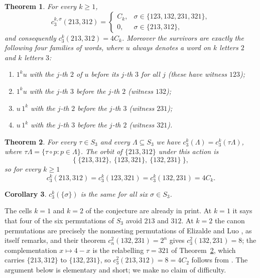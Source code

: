 \documentclass[11pt]{amsart}
\newtheorem{theorem}{Theorem}
\newtheorem{corollary}[theorem]{Corollary}
\theoremstyle{definition}
\newcommand{\Cat}{C}
\begin{document}
\begin{theorem}\label{thm:main}
For every $k\ge1$,
\[
c_3^{k,\sigma}(213,312)=
\begin{cases}
\Cat_k,&\sigma\in\{123,132,231,321\},\\
0,&\sigma\in\{213,312\},
\end{cases}
\]
and consequently $c_3^k(213,312)=4\Cat_k$.
Moreover the survivors are exactly the following four families of words, where
$u$ always denotes a word on $k$ letters $2$ and $k$ letters $3$:
\begin{enumerate}
\item[\rm(i)] $1^k u$ with the $j$-th $2$ of $u$ before its $j$-th $3$ for all
      $j$ \quad (these have witness $123$);
\item[\rm(ii)] $1^k u$ with the $j$-th $3$ before the $j$-th $2$ \quad
      (witness $132$);
\item[\rm(iii)] $u\,1^k$ with the $j$-th $2$ before the $j$-th $3$ \quad
      (witness $231$);
\item[\rm(iv)] $u\,1^k$ with the $j$-th $3$ before the $j$-th $2$ \quad
      (witness $321$).
\end{enumerate}
\end{theorem}

\begin{theorem}\label{thm:orbit}
For every $\tau\in S_3$ and every $\Lambda\subseteq S_3$ we have
$c_3^k(\Lambda)=c_3^k(\tau\Lambda)$, where
$\tau\Lambda=\{\tau\circ p:p\in\Lambda\}$. The orbit of $\{213,312\}$ under
this action is
\[
\bigl\{\ \{213,312\},\ \{123,321\},\ \{132,231\}\ \bigr\},
\]
so for every $k\ge1$
\[
c_3^k(213,312)=c_3^k(123,321)=c_3^k(132,231)=4\Cat_k .
\]
\end{theorem}

\begin{corollary}\label{cor:single}
$c_3^k(\{\sigma\})$ is the same for all six $\sigma\in S_3$.
\end{corollary}

The cells $k=1$ and $k=2$ of the conjecture are already in print. At $k=1$ it
says that four of the six permutations of $S_3$ avoid $213$ and $312$. At
$k=2$ the canon permutations are precisely the nonnesting permutations of
Elizalde and Luo \cite{EL}, as \cite{Laudone} itself remarks, and their theorem
$c_n^2(132,231)=2^n$ gives $c_3^2(132,231)=8$; the complementation
$x\mapsto4-x$ is the relabelling $\tau=321$ of Theorem~\ref{thm:orbit}, which
carries $\{213,312\}$ to $\{132,231\}$, so $c_3^2(213,312)=8=4\Cat_2$ follows
from \cite{EL}. The argument below is elementary and short; we make no claim of
difficulty.
\end{document}
